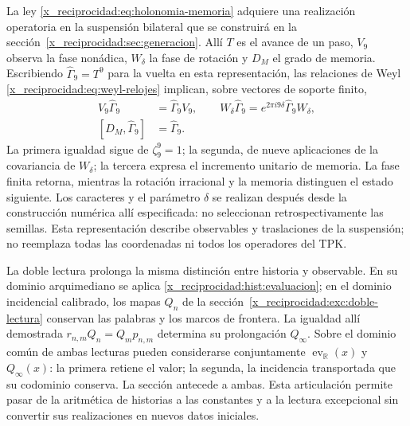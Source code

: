 La ley \eqref{x_reciprocidad:eq:holonomia-memoria} adquiere una realización operatoria
en la suspensión bilateral que se construirá en la
sección~\ref{x_reciprocidad:sec:generacion}. Allí \(T\) es el avance de un paso,
\(V_9\) observa la fase nonádica, \(W_\delta\) la fase de rotación y
\(D_M\) el grado de memoria. Escribiendo
\(\widehat\Gamma_9=T^9\) para la vuelta en esta representación,
las relaciones de Weyl \eqref{x_reciprocidad:eq:weyl-relojes} implican, sobre vectores
de soporte finito,
\begin{equation}
 \begin{aligned}
 V_9\widehat\Gamma_9&=\widehat\Gamma_9V_9,\qquad
 W_\delta\widehat\Gamma_9=e^{2\pi i9\delta}
     \widehat\Gamma_9W_\delta,\\
 [D_M,\widehat\Gamma_9]&=\widehat\Gamma_9.
 \end{aligned}
 \label{x_reciprocidad:hist:tres-retornos}
\end{equation}
La primera igualdad sigue de \(\zeta_9^9=1\); la segunda, de nueve
aplicaciones de la covariancia de \(W_\delta\); la tercera expresa
el incremento unitario de memoria. La fase finita retorna, mientras la
rotación irracional y la memoria distinguen el estado siguiente. Los
caracteres y el parámetro \(\delta\) se realizan después desde la
construcción numérica allí especificada: no seleccionan retrospectivamente
las semillas. Esta representación describe observables y traslaciones de
la suspensión; no reemplaza todas las coordenadas ni todos los operadores
del TPK.

La doble lectura prolonga la misma distinción entre historia y observable.
En su dominio arquimediano se aplica \eqref{x_reciprocidad:hist:evaluacion}; en el
dominio incidencial calibrado, los mapas \(Q_n\) de la
sección~\ref{x_reciprocidad:exc:doble-lectura} conservan las palabras y los marcos de
frontera. La igualdad allí demostrada
\(r_{n,m}Q_n=Q_mp_{n,m}\) determina su prolongación \(Q_\infty\).
Sobre el dominio común de ambas lecturas pueden considerarse conjuntamente
\(\operatorname{ev}_{\mathbb R}(x)\) y \(Q_\infty(x)\): la
primera retiene el valor; la segunda, la incidencia transportada que su
codominio conserva. La sección antecede a ambas. Esta articulación permite
pasar de la aritmética de historias a las constantes y a la lectura
excepcional sin convertir sus realizaciones en nuevos datos iniciales.


